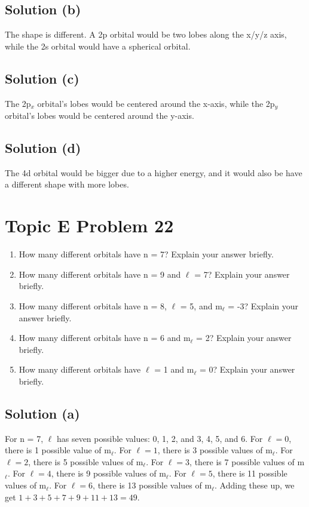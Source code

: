 \documentclass[10pt]{article}
\begin{document}
        \subsection{Solution (b)}
            The shape is different.
            A 2p orbital would be two lobes along the x/y/z axis, while the 2s orbital would have a spherical orbital.

        \subsection{Solution (c)}
            The 2p$_x$ orbital's lobes would be centered around the x-axis, while the 2p$_y$ orbital's lobes would be centered around the y-axis.

        \subsection{Solution (d)}
            The 4d orbital would be bigger due to a higher energy, and it would also be have a different shape with more lobes. 

    \pagebreak
    \section{Topic E Problem 22}
        \begin{enumerate}[label=\alph*)]
            \item   How many different orbitals have n = 7? Explain your answer briefly.
            \item   How many different orbitals have n = 9 and $\ell$ = 7? Explain your answer briefly.
            \item   How many different orbitals have n = 8, $\ell$ = 5, and m$_\ell$ = -3? Explain your answer briefly.
            \item   How many different orbitals have n = 6 and m$_\ell$ = 2? Explain your answer briefly.
            \item   How many different orbitals have $\ell$ = 1 and m$_\ell$ = 0? Explain your answer briefly.
        \end{enumerate}
        
        \subsection{Solution (a)}
            For n = 7, $\ell$ has seven possible values: 0, 1, 2, and 3, 4, 5, and 6.
            For $\ell = 0$, there is 1 possible value of m$_\ell$.
            For $\ell = 1$, there is 3 possible values of m$_\ell$.
            For $\ell = 2$, there is 5 possible values of m$_\ell$.
            For $\ell = 3$, there is 7 possible values of m$_\ell$.
            For $\ell = 4$, there is 9 possible values of m$_\ell$.
            For $\ell = 5$, there is 11 possible values of m$_\ell$.
            For $\ell = 6$, there is 13 possible values of m$_\ell$.
            Adding these up, we get $1 + 3 + 5 + 7 + 9 + 11 + 13 = \boxed{49}$.
        
\end{document}

